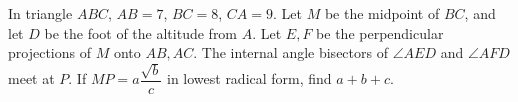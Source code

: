 In triangle $ABC$, $AB=7$, $BC=8$, $CA=9$. Let $M$ be the midpoint of $BC$, and let $D$ be the foot of the altitude from $A$. Let $E,F$ be the perpendicular projections of $M$ onto $AB,AC$. The internal angle bisectors of $\angle AED$ and $\angle AFD$ meet at $P$. If $MP=a\dfrac{\sqrt b}{c}$ in lowest radical form, find $a+b+c$.

